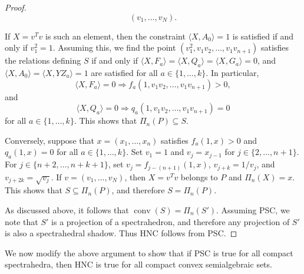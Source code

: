 \documentclass[11pt]{article} %
\DeclareMathOperator{\conv}{conv}
\begin{document}
\begin{proof}
\[(v_1,\ldots,v_N).\]

If $X = v^Tv$ is such an element, then the constraint $\langle X, A_0 \rangle = 1$ is satisfied if and only if $v_1^2 = 1$. Assuming this, we find the point $(v_1^2,v_1v_2,\ldots,v_1v_{n+1})$ satisfies the relations defining $S$ if and only if $\langle X, F_a\rangle=\langle X,Q_a\rangle =\langle X,G_a\rangle=0$, and $\langle X,A_0\rangle = \langle X, YZ_a \rangle = 1$ are satisfied for all $a \in \{1,\ldots,k\}$. In particular, 
\[ \langle X,F_a \rangle=0 \Rightarrow f_a(1,v_1v_2,\ldots,v_1v_{n+1}) >0,\]
and
\[\langle X,Q_a\rangle=0 \Rightarrow q_a(1,v_1v_2,\ldots,v_1v_{n+1}) =0\]
for all $a \in \{1,\ldots,k\}$.
This shows that $\Pi_n(P) \subseteq S$.

Conversely, suppose that $x=(x_1,\ldots,x_n)$ satisfies $f_a(1,x)>0$ and $q_a(1,x)=0$ for all $a \in \{1,\ldots,k\}$. Set $v_1 = 1$ and $v_j = x_{j-1}$ for $j \in \{2,\ldots,n+1\}$. For $j \in \{n+2,\ldots,n+k+1\}$, set $v_j =f_{j-(n+1)}(1,x)$, $v_{j+k} = 1\slash v_j$, and $v_{j+2k} = \sqrt{v_j}$. If $v = (v_1,\ldots,v_N)$, then $X=v^Tv$ belongs to $P$ and $\Pi_n(X) = x$. This shows that $S \subseteq \Pi_n(P)$, and therefore $S= \Pi_n(P)$.


As discussed above, it follows that $\conv(S) = \Pi_n(S')$. Assuming PSC, we note that $S'$ is a projection of a spectrahedron, and therefore any projection of $S'$ is also a spectrahedral shadow. Thus HNC follows from PSC.
\end{proof}
We now modify the above argument to show that if PSC is true for all compact spectrahedra, then HNC is true for all compact convex semialgebraic sets.
\end{document}
